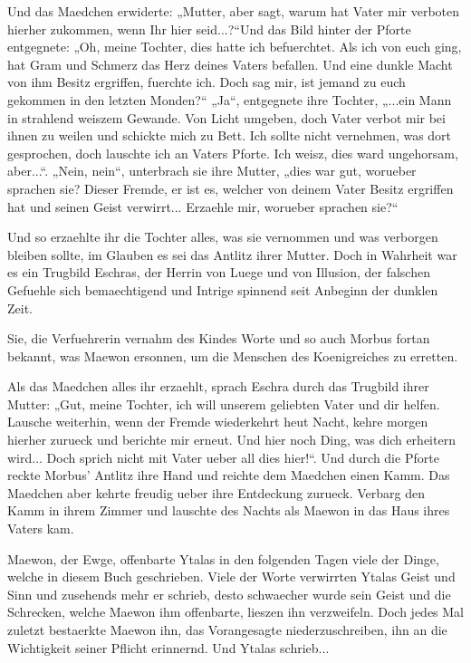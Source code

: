 \documentclass[a5paper,8pt]{book}
\begin{document}
Und das Maedchen erwiderte: „Mutter, aber sagt, warum hat Vater mir verboten hierher zukommen, wenn Ihr hier seid...?“Und das Bild hinter der Pforte entgegnete: „Oh, meine Tochter, dies hatte ich befuerchtet. Als ich von euch ging, hat Gram und Schmerz das Herz deines Vaters befallen. Und eine dunkle Macht von ihm Besitz ergriffen, fuerchte ich. Doch sag mir, ist jemand zu euch gekommen in den letzten Monden?“ „Ja“, entgegnete ihre Tochter, „...ein Mann in strahlend weiszem Gewande. Von Licht umgeben, doch Vater verbot mir bei ihnen zu weilen und schickte mich zu Bett. Ich sollte nicht vernehmen, was dort gesprochen, doch lauschte ich an Vaters Pforte. Ich weisz, dies ward ungehorsam, aber...“. „Nein, nein“, unterbrach sie ihre Mutter, „dies war gut, worueber sprachen sie? Dieser Fremde, er ist es, welcher von deinem Vater Besitz ergriffen hat und seinen Geist verwirrt... Erzaehle mir, worueber sprachen sie?“


Und so erzaehlte ihr die Tochter alles, was sie vernommen und was verborgen bleiben sollte, im Glauben es sei das Antlitz ihrer Mutter. Doch in Wahrheit war es ein Trugbild Eschras, der Herrin von Luege und von Illusion, der falschen Gefuehle sich bemaechtigend und Intrige spinnend seit Anbeginn der dunklen Zeit. 

Sie, die Verfuehrerin vernahm des Kindes Worte und so auch Morbus fortan bekannt, was Maewon ersonnen, um die Menschen des Koenigreiches zu erretten.

Als das Maedchen alles ihr erzaehlt, sprach Eschra durch das Trugbild ihrer Mutter: „Gut, meine Tochter, ich will unserem geliebten Vater und dir helfen. Lausche weiterhin, wenn der Fremde wiederkehrt heut Nacht, kehre morgen hierher zurueck und berichte mir erneut. Und hier noch Ding, was dich erheitern wird... Doch sprich nicht mit Vater ueber all dies hier!“. Und durch die Pforte reckte Morbus’ Antlitz ihre Hand und reichte dem Maedchen einen Kamm. Das Maedchen aber kehrte freudig ueber ihre Entdeckung zurueck. Verbarg den Kamm in ihrem Zimmer und lauschte des Nachts als Maewon in das Haus ihres Vaters kam.

Maewon, der Ewge, offenbarte Ytalas in den folgenden Tagen viele der Dinge, welche in diesem Buch geschrieben. Viele der Worte verwirrten Ytalas Geist und Sinn und zusehends mehr er schrieb, desto schwaecher wurde sein Geist und die Schrecken, welche Maewon ihm offenbarte, lieszen ihn verzweifeln. Doch jedes Mal zuletzt bestaerkte Maewon ihn, das Vorangesagte niederzuschreiben, ihn an die Wichtigkeit seiner Pflicht erinnernd. Und Ytalas schrieb...
\end{document}
